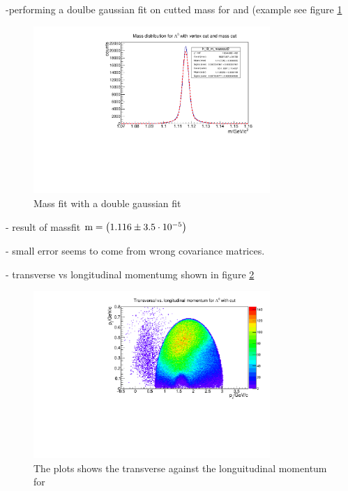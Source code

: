 		-performing a doulbe gaussian fit on cutted mass for \lam and \alam (example see figure \ref{fig:lambda0_massfit}
		
		\begin{figure}
			\centering
				\includegraphics[width=0.8\textwidth]{./plots/lambda0/lambda0_m_masscut2.pdf}
			\caption{Mass fit with a double gaussian fit}
			\label{fig:lambda0_massfit}
		\end{figure}
		
		- result of massfit $\textnormal{m} = \left(1.116 \pm 3.5\cdot 10^{-5}\right)$ \massunit
		
		- small error seems to come from wrong covariance matrices.
		
		- transverse vs longitudinal momentumg shown in figure \ref{fig:lambda0_pt_vs_pz}
		
		\begin{figure}
			
			\centering
			\includegraphics[width=0.8\textwidth]{./plots/lambda0/lambda0_pt_vs_pz_cut.pdf}
			\caption{The plots shows the transverse against the longuitudinal momentum for \lam}
			\label{fig:lambda0_pt_vs_pz}
		
		\end{figure}
		
